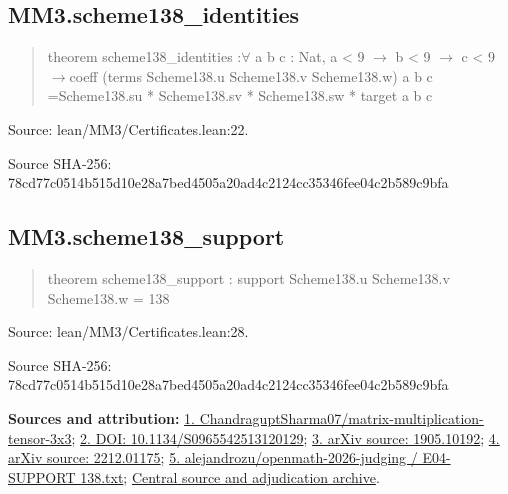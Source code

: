 \documentclass[11pt,a4paper]{article}
\begin{document}
\begin{samepage}
\subsection{MM3.scheme138\_identities}
\begin{quote}\small\ttfamily theorem scheme138\_identities :\newline     \ensuremath{\forall} a b c : Nat, a < 9 \ensuremath{\to} b < 9 \ensuremath{\to} c < 9 \ensuremath{\to}\newline       coeff (terms Scheme138.u Scheme138.v Scheme138.w) a b c =\newline         Scheme138.su * Scheme138.sv * Scheme138.sw * target a b c\end{quote}
{\small Source: lean/MM3/Certificates.lean:22.\par}

{\small Source SHA-256: 78cd77c0514b515d10e28a7bed4505a20ad4c2124cc35346fee04c2b589c9bfa\par}

\end{samepage}
\begin{samepage}
\subsection{MM3.scheme138\_support}
\begin{quote}\small\ttfamily theorem scheme138\_support : support Scheme138.u Scheme138.v Scheme138.w = 138\end{quote}
{\small Source: lean/MM3/Certificates.lean:28.\par}

{\small Source SHA-256: 78cd77c0514b515d10e28a7bed4505a20ad4c2124cc35346fee04c2b589c9bfa\par}

{\small\textbf{Sources and attribution:} \href{https://github.com/ChandraguptSharma07/matrix-multiplication-tensor-3x3/tree/479c2416b6261ee841052eef4881df0e40054f3f}{1. ChandraguptSharma07/matrix-multiplication-tensor-3x3}; \href{https://doi.org/10.1134/S0965542513120129}{2. DOI: 10.1134/S0965542513120129}; \href{https://arxiv.org/abs/1905.10192}{3. arXiv source: 1905.10192}; \href{https://arxiv.org/abs/2212.01175}{4. arXiv source: 2212.01175}; \href{https://github.com/alejandrozu/openmath-2026-judging/blob/d0ed487f487fa7ec814ff705ab55249983fe8707/OpenMath-Judging/review/entries/E04-SUPPORT138.txt}{5. alejandrozu/openmath-2026-judging / E04-SUPPORT 138.txt}; \href{https://github.com/alejandrozu/openmath-2026-judging}{Central source and adjudication archive}.\par}

\end{samepage}
\end{document}
